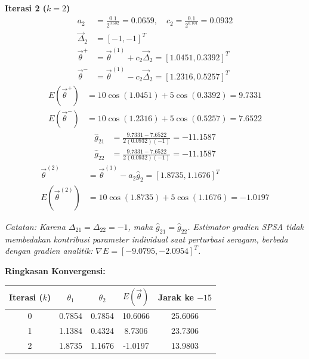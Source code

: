 \textbf{Iterasi 2 ($k=2$)}
\begin{align}
    a_2 &= \frac{0.1}{2^{0.602}} = 0.0659, \quad c_2 = \frac{0.1}{2^{0.101}} = 0.0932 \\
    \vec{\Delta}_2 &= [-1, -1]^T \\
    \vec{\theta}^+ &= \vec{\theta}^{(1)} + c_2 \vec{\Delta}_2 = [1.0451, 0.3392]^T \\
    \vec{\theta}^- &= \vec{\theta}^{(1)} - c_2 \vec{\Delta}_2 = [1.2316, 0.5257]^T
\end{align}
\begin{align}
    E(\vec{\theta}^+) &= 10 \cos(1.0451) + 5 \cos(0.3392) = 9.7331 \\
    E(\vec{\theta}^-) &= 10 \cos(1.2316) + 5 \cos(0.5257) = 7.6522
\end{align}
\begin{align}
    \hat{g}_{21} &= \frac{9.7331 - 7.6522}{2(0.0932)(-1)} = -11.1587 \\
    \hat{g}_{22} &= \frac{9.7331 - 7.6522}{2(0.0932)(-1)} = -11.1587
\end{align}
\begin{align}
    \vec{\theta}^{(2)} &= \vec{\theta}^{(1)} - a_2 \hat{g}_2 = [1.8735, 1.1676]^T \\
    E(\vec{\theta}^{(2)}) &= 10 \cos(1.8735) + 5 \cos(1.1676) = -1.0197
\end{align}

\textit{Catatan: Karena $\Delta_{21} = \Delta_{22} = -1$, maka $\hat{g}_{21} = \hat{g}_{22}$. Estimator gradien SPSA tidak membedakan kontribusi parameter individual saat perturbasi seragam, berbeda dengan gradien analitik: $\nabla E = [-9.0795, -2.0954]^T$.}

\textbf{Ringkasan Konvergensi:}
\begin{center}
\begin{tabular}{|c|c|c|c|c|}
\hline
Iterasi ($k$) & $\theta_1$ & $\theta_2$ & $E(\vec{\theta})$ & Jarak ke $-15$ \\ \hline
0 & 0.7854 & 0.7854 & 10.6066 & 25.6066 \\ \hline
1 & 1.1384 & 0.4324 & 8.7306 & 23.7306 \\ \hline
2 & 1.8735 & 1.1676 & -1.0197 & 13.9803 \\ \hline
\end{tabular}
\end{center}

